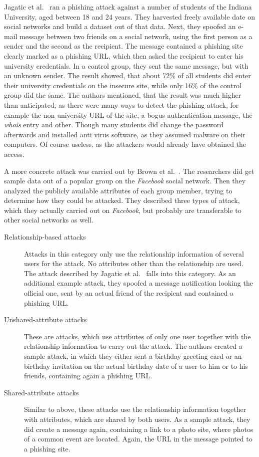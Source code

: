 Jagatic et al.~\cite{jagatic2007} ran a phishing attack against a number of
students of the Indiana University, aged between 18 and 24 years. They
harvested freely available date on social networks and build a dataset out of
that data. Next, they spoofed an e-mail message between two friends on a social
network, using the first person as a sender and the second as the recipient.
The message contained a phishing site clearly marked as a phishing URL, which
then asked the recipient to enter his university credentials. In a control
group, they sent the same message, but with an unknown sender. The result
showed, that about 72\% of all students did enter their university credentials
on the insecure site, while only 16\% of the control group did the same. The
authors mentioned, that the result was much higher than anticipated, as there
were many ways to detect the phishing attack, for example the non-university
URL of the site, a bogus authentication message, the \textit{whois} entry and
other. Though many students did change the password afterwards and installed
anti virus software, as they assumed malware on their computers. Of course
useless, as the attackers would already have obtained the access.

A more concrete attack was carried out by Brown et al.~\cite{brown2008}. The
researchers did get sample data out of a popular group on the \textit{Facebook}
social network. Then they analyzed the publicly available attributes of each
group member, trying to determine how they could be attacked. They described
three types of attack, which they actually carried out on \textit{Facebook},
but probably are transferable to other social networks as well. 

\begin{description}
\item[Relationship-based attacks]
Attacks in this category only use the relationship information of several
users for the attack. No attributes other than the relationship are used. The
attack described by Jagatic et al.~\cite{jagatic2007} falls into this category. As an
additional example attack, they spoofed a message notification looking the
official one, sent by an actual friend of the recipient and contained a
phishing URL.

\item[Unshared-attribute attacks]
These are attacks, which use attributes of only one user together
with the relationship information to carry out the attack. The authors created
a sample attack, in which they either sent a birthday greeting card or an
birthday invitation on the actual birthday date of a user to him or to his
friends, containing again a phishing URL.

\item[Shared-attribute attacks]
Similar to above, these attacks use the relationship information together with
attributes, which are shared by both users. As a sample attack, they did create
a message again, containing a link to a photo site, where photos of a common
event are located. Again, the URL in the message pointed to a phishing site.
\end{description}

